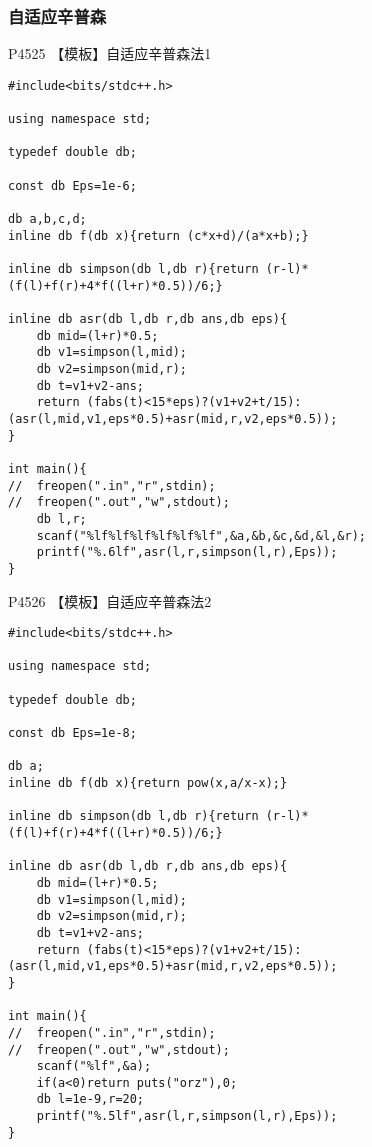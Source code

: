 \documentclass{ctexart}
\begin{document}
\subsubsection{自适应辛普森}
P4525 【模板】自适应辛普森法1
\begin{lstlisting}
#include<bits/stdc++.h>

using namespace std;

typedef double db;

const db Eps=1e-6;

db a,b,c,d;
inline db f(db x){return (c*x+d)/(a*x+b);}

inline db simpson(db l,db r){return (r-l)*(f(l)+f(r)+4*f((l+r)*0.5))/6;}

inline db asr(db l,db r,db ans,db eps){
    db mid=(l+r)*0.5;
    db v1=simpson(l,mid);
    db v2=simpson(mid,r);
    db t=v1+v2-ans;
    return (fabs(t)<15*eps)?(v1+v2+t/15):(asr(l,mid,v1,eps*0.5)+asr(mid,r,v2,eps*0.5));
}

int main(){
//	freopen(".in","r",stdin);
//	freopen(".out","w",stdout);
    db l,r;
    scanf("%lf%lf%lf%lf%lf%lf",&a,&b,&c,&d,&l,&r);
    printf("%.6lf",asr(l,r,simpson(l,r),Eps));
}
\end{lstlisting}
P4526 【模板】自适应辛普森法2
\begin{lstlisting}
#include<bits/stdc++.h>

using namespace std;

typedef double db;

const db Eps=1e-8;

db a;
inline db f(db x){return pow(x,a/x-x);}

inline db simpson(db l,db r){return (r-l)*(f(l)+f(r)+4*f((l+r)*0.5))/6;}

inline db asr(db l,db r,db ans,db eps){
    db mid=(l+r)*0.5;
    db v1=simpson(l,mid);
    db v2=simpson(mid,r);
    db t=v1+v2-ans;
    return (fabs(t)<15*eps)?(v1+v2+t/15):(asr(l,mid,v1,eps*0.5)+asr(mid,r,v2,eps*0.5));
}

int main(){
//	freopen(".in","r",stdin);
//	freopen(".out","w",stdout);
    scanf("%lf",&a);
    if(a<0)return puts("orz"),0;
    db l=1e-9,r=20;
    printf("%.5lf",asr(l,r,simpson(l,r),Eps));
}
\end{lstlisting}
\end{document}
